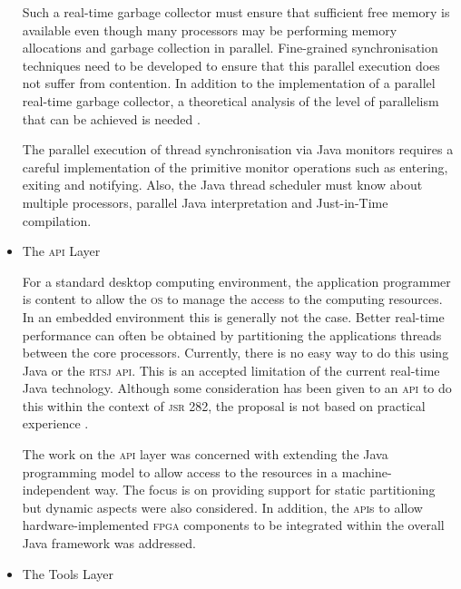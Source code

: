 \documentclass{sig-alternate}
\newcommand{\acronym}[1]{\textsc{#1}}
\begin{document}
\begin{itemize}
Such a real-time garbage collector must ensure that 
sufficient free memory is available even though many processors
may be performing memory allocations and garbage collection
in parallel. Fine-grained synchronisation techniques need
to be developed to ensure that this parallel execution does
not suffer from contention. In addition to the implementation
of a parallel real-time garbage collector, a theoretical
analysis of the level of parallelism that can be achieved is
needed \cite{sie:08}.

The parallel execution of thread synchronisation via Java
monitors requires a careful implementation of the primitive
monitor operations such as entering, exiting and notifying.
Also, the Java thread scheduler must know about multiple
processors, parallel Java interpretation and Just-in-Time compilation.

\item The \acronym{api} Layer

For a standard desktop computing environment, the application
programmer is content to allow the \acronym{os} to manage
the access to the computing resources. In an embedded environment
this is generally not the case. Better real-time
performance can often be obtained by partitioning the applications
threads between the core processors. Currently,
there is no easy way to do this 
using Java or the \acronym{rtsj} \acronym{api}.
This is an accepted limitation of the current real-time Java
technology. Although some consideration has been given to
an \acronym{api} to do this within the context 
of \acronym{jsr} 282, the proposal
is not based on practical experience \cite{wel:08,wel:09}.

The work on the \acronym{api} layer was concerned with extending
the Java programming model to allow access to the resources
in a machine-independent way. The focus is on providing
support for static partitioning but dynamic aspects were 
also considered.
In addition, the \acronym{api}s to allow 
hardware-implemented \acronym{fpga} components
to be integrated within the overall Java
framework was addressed.

\item The Tools Layer


\end{itemize}
\end{document}
